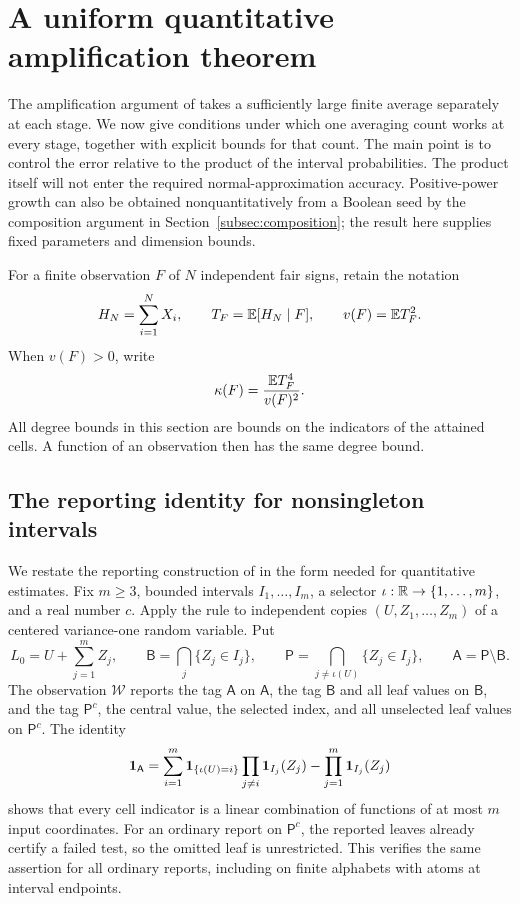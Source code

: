 \section{A uniform quantitative amplification theorem}
\label{amp:sec}

The amplification argument of \cite{OpenAI2026} takes a sufficiently large
finite average separately at each stage.  We now give conditions under which
one averaging count works at every stage, together with explicit bounds for
that count.  The main point is to control the error relative to the product
of the interval probabilities.  The product itself will not enter the required
normal-approximation accuracy.  Positive-power growth can also be obtained
nonquantitatively from a Boolean seed by the composition argument in
Section~\ref{subsec:composition}; the result here supplies fixed
parameters and dimension bounds.

For a finite observation $F$ of $N$ independent fair signs, retain the notation
\[
 H_N=\sum_{i=1}^N X_i,\qquad T_F=\mathbb E[H_N\mid F],\qquad
 v(F)=\mathbb E T_F^2.
\]
When $v(F)>0$, write
\[
 \kappa(F)=\frac{\mathbb E T_F^4}{v(F)^2}.
\]
All degree bounds in this section are bounds on the indicators of the
attained cells.  A function of an observation then has the same degree bound.

\subsection{The reporting identity for nonsingleton intervals}

We restate the reporting construction of \cite{OpenAI2026} in the form
needed for quantitative estimates.  Fix $m\ge3$, bounded intervals
$I_1,\ldots,I_m$, a selector $\iota:\mathbb R\to\{1,\ldots,m\}$, and a real
number $c$.  Apply the rule to independent copies
$(U,Z_1,\ldots,Z_m)$ of a centered variance-one random variable.  Put
\[
 L_0=U+\sum_{j=1}^m Z_j,\qquad
 \mathsf B=\bigcap_j\{Z_j\in I_j\},\qquad
 \mathsf P=\bigcap_{j\ne\iota(U)}\{Z_j\in I_j\},\qquad
 \mathsf A=\mathsf P\setminus\mathsf B.
\]
The observation $\mathcal W$ reports the tag $\mathsf A$ on $\mathsf A$,
the tag $\mathsf B$ and all leaf values on $\mathsf B$, and the tag
$\mathsf P^c$, the central value, the selected index, and all unselected
leaf values on $\mathsf P^c$.  The identity
\begin{equation}
 \mathbf 1_{\mathsf A}
 =\sum_{i=1}^m\mathbf 1_{\{\iota(U)=i\}}
                 \prod_{j\ne i}\mathbf 1_{I_j}(Z_j)
       -\prod_{j=1}^m\mathbf 1_{I_j}(Z_j)
 \label{amp:cell-identity}
\end{equation}
shows that every cell indicator is a linear combination of functions of at
most $m$ input coordinates.  For an ordinary report on $\mathsf P^c$, the
reported leaves already certify a failed test, so the omitted leaf is
unrestricted.  This verifies the same assertion for all ordinary reports,
including on finite alphabets with atoms at interval endpoints.

